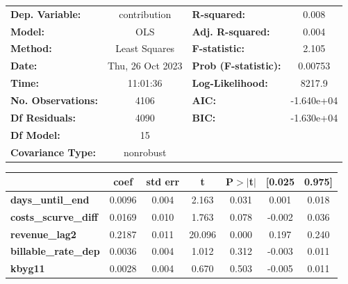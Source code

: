 \begin{center}
\begin{tabular}{lclc}
\toprule
\textbf{Dep. Variable:}                   &   contribution   & \textbf{  R-squared:         } &     0.008   \\
\textbf{Model:}                           &       OLS        & \textbf{  Adj. R-squared:    } &     0.004   \\
\textbf{Method:}                          &  Least Squares   & \textbf{  F-statistic:       } &     2.105   \\
\textbf{Date:}                            & Thu, 26 Oct 2023 & \textbf{  Prob (F-statistic):} &  0.00753    \\
\textbf{Time:}                            &     11:01:36     & \textbf{  Log-Likelihood:    } &    8217.9   \\
\textbf{No. Observations:}                &        4106      & \textbf{  AIC:               } & -1.640e+04  \\
\textbf{Df Residuals:}                    &        4090      & \textbf{  BIC:               } & -1.630e+04  \\
\textbf{Df Model:}                        &          15      & \textbf{                     } &             \\
\textbf{Covariance Type:}                 &    nonrobust     & \textbf{                     } &             \\
\bottomrule
\end{tabular}
\begin{tabular}{lcccccc}
                                          & \textbf{coef} & \textbf{std err} & \textbf{t} & \textbf{P$> |$t$|$} & \textbf{[0.025} & \textbf{0.975]}  \\
\midrule
\textbf{days\_until\_end}                 &       0.0096  &        0.004     &     2.163  &         0.031        &        0.001    &        0.018     \\
\textbf{costs\_scurve\_diff}              &       0.0169  &        0.010     &     1.763  &         0.078        &       -0.002    &        0.036     \\
\textbf{revenue\_lag2}                    &       0.2187  &        0.011     &    20.096  &         0.000        &        0.197    &        0.240     \\
\textbf{billable\_rate\_dep}              &       0.0036  &        0.004     &     1.012  &         0.312        &       -0.003    &        0.011     \\
\textbf{kbyg11}                           &       0.0028  &        0.004     &     0.670  &         0.503        &       -0.005    &        0.011     \\

\end{tabular}
\end{center}
